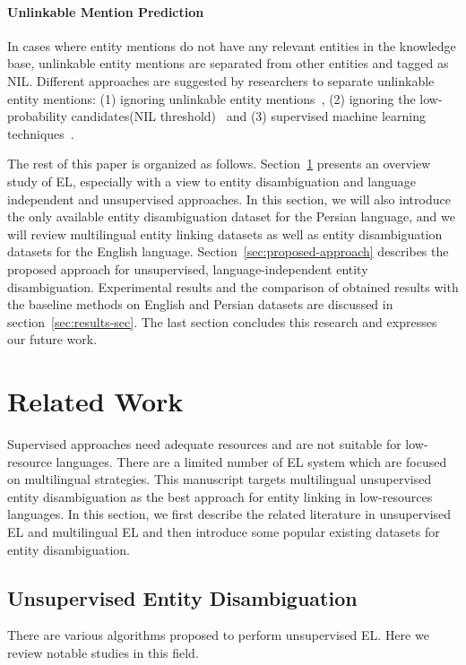 \documentclass{article}
\begin{document}
\paragraph{Unlinkable Mention Prediction} In cases where entity mentions do not have any relevant entities in the knowledge base, unlinkable entity mentions are separated from other entities and tagged as NIL. Different approaches are suggested by researchers to separate unlinkable entity mentions: (1) ignoring unlinkable entity mentions~\cite{han2011collective,han2012entity,pershina2015personalized}, (2) ignoring the low-probability candidates(NIL threshold)~\cite{shen2012linden,yamada2016joint} and (3) supervised machine learning techniques~\cite{shen2014entity,taufer2017named,zhang2010nusi2r,zhang2011entity}.

The rest of this paper is organized as follows. Section~\ref{sec:related-works-sec} presents an overview study of EL, especially with a view to entity disambiguation and language independent and unsupervised approaches. In this section, we will also introduce the only available entity disambiguation dataset for the Persian language, and we will review multilingual entity linking datasets as well as entity disambiguation datasets for the English language. Section~\ref{sec:proposed-approach} describes the proposed approach for unsupervised, language-independent entity disambiguation. Experimental results and the comparison of obtained results with the baseline methods on English and Persian datasets are discussed in section~\ref{sec:results-sec}. The last section concludes this research and expresses our future work.

\section{Related Work}
\label{sec:related-works-sec}
Supervised approaches need adequate resources and are not suitable for low-resource languages. There are a limited number of EL system which are focused on multilingual strategies. This manuscript targets multilingual unsupervised entity disambiguation as the best approach for entity linking in low-resources languages. In this section, we first describe the related literature in unsupervised EL and multilingual EL and then introduce some popular existing datasets for entity disambiguation.

\subsection{Unsupervised Entity Disambiguation}
There are various algorithms proposed to perform unsupervised EL. Here we review notable studies in this field.
\end{document}
